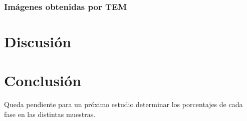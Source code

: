 \documentclass{article}
\theoremstyle{definition}
\theoremstyle{remark}
\begin{document}
\subsubsection{Imágenes obtenidas por TEM}



\section{Discusión}
\section{Conclusión}
Queda pendiente para un próximo estudio determinar los porcentajes de cada fase en las distintas muestras. 

\newpage

\nocite{*} 


\end{document}
